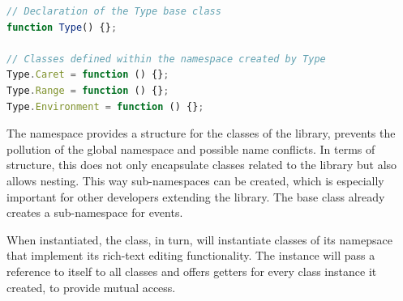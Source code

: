 \begin{lstlisting}[language=JavaScript, caption={Declaration of Caret, Range and Environment classes}, label=lst:type_declaration_example]
// Declaration of the Type base class
function Type() {};

// Classes defined within the namespace created by Type
Type.Caret = function () {};
Type.Range = function () {};
Type.Environment = function () {};
\end{lstlisting}

The namespace provides a structure for the classes of the library, prevents the pollution of the global namespace and possible name conflicts. In terms of structure, this does not only encapsulate classes related to the library but also allows nesting. This way sub-namespaces can be created, which is especially important for other developers extending the library. The  base class already creates a sub-namespace  for events.


When instantiated, the  class, in turn, will instantiate classes of its namepsace that implement its rich-text editing functionality. The  instance will pass a reference to itself to all classes and offers getters for every class instance it created, to provide mutual access.





